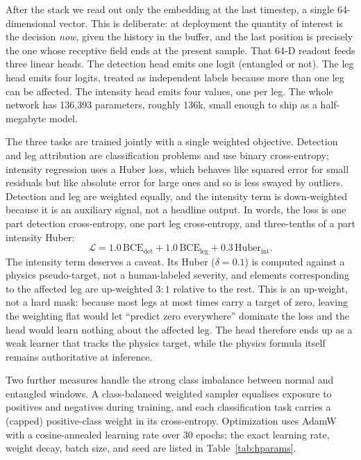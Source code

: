 \documentclass[conference]{IEEEtran}
\begin{document}
After the stack we read out only the embedding at the last timestep, a single 64-dimensional vector. This is deliberate: at deployment the quantity of interest is the decision \emph{now}, given the history in the buffer, and the last position is precisely the one whose receptive field ends at the present sample. That 64-D readout feeds three linear heads. The detection head emits one logit (entangled or not). The leg head emits four logits, treated as independent labels because more than one leg can be affected. The intensity head emits four values, one per leg. The whole network has 136{,}393 parameters, roughly 136k, small enough to ship as a half-megabyte model.

The three tasks are trained jointly with a single weighted objective. Detection and leg attribution are classification problems and use binary cross-entropy; intensity regression uses a Huber loss, which behaves like squared error for small residuals but like absolute error for large ones and so is less swayed by outliers. Detection and leg are weighted equally, and the intensity term is down-weighted because it is an auxiliary signal, not a headline output. In words, the loss is one part detection cross-entropy, one part leg cross-entropy, and three-tenths of a part intensity Huber:
\begin{equation}
\mathcal{L} = 1.0\,\mathrm{BCE}_{\text{det}} + 1.0\,\mathrm{BCE}_{\text{leg}} + 0.3\,\mathrm{Huber}_{\text{int}} .
\end{equation}
The intensity term deserves a caveat. Its Huber ($\delta=0.1$) is computed against a physics pseudo-target, not a human-labeled severity, and elements corresponding to the affected leg are up-weighted $3{:}1$ relative to the rest. This is an up-weight, not a hard mask: because most legs at most times carry a target of zero, leaving the weighting flat would let ``predict zero everywhere'' dominate the loss and the head would learn nothing about the affected leg. The head therefore ends up as a weak learner that tracks the physics target, while the physics formula itself remains authoritative at inference.

Two further measures handle the strong class imbalance between normal and entangled windows. A class-balanced weighted sampler equalises exposure to positives and negatives during training, and each classification task carries a (capped) positive-class weight in its cross-entropy. Optimization uses AdamW \cite{loshchilov2019adamw} with a cosine-annealed learning rate over 30 epochs; the exact learning rate, weight decay, batch size, and seed are listed in Table~\ref{tab:hparams}.
\end{document}
